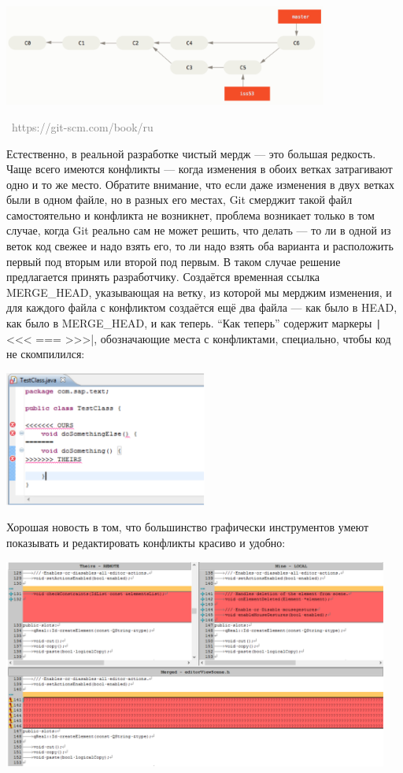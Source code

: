 \documentclass[a5paper]{article}
\newcommand{\attribution}[1] {
\vspace{-5mm}\begin{flushright}\begin{scriptsize}\textcolor{gray}{\textcopyright\, #1}\end{scriptsize}\end{flushright}
}
\begin{document}
\begin{center}
	\includegraphics[width=0.8\textwidth]{mergeResult.png}
	\attribution{https://git-scm.com/book/ru}
\end{center}

Естественно, в реальной разработке чистый мердж --- это большая редкость. Чаще всего имеются конфликты --- когда изменения в обоих ветках затрагивают одно и то же место. Обратите внимание, что если даже изменения в двух ветках были в одном файле, но в разных его местах, Git смерджит такой файл самостоятельно и конфликта не возникнет, проблема возникает только в том случае, когда Git реально сам не может решить, что делать --- то ли в одной из веток код свежее и надо взять его, то ли надо взять оба варианта и расположить первый под вторым или второй под первым. В таком случае решение предлагается принять разработчику. Создаётся временная ссылка MERGE\_HEAD, указывающая на ветку, из которой мы мерджим изменения, и для каждого файла с конфликтом создаётся ещё два файла --- как было в HEAD, как было в MERGE\_HEAD, и как теперь. ``Как теперь'' содержит маркеры \texttt|<<< === >>>|, обозначающие места с конфликтами, специально, чтобы код не скомпилился:

\begin{center}
	\includegraphics[width=0.5\textwidth]{conflictsInCode.png}
\end{center}

Хорошая новость в том, что большинство графически инструментов умеют показывать и редактировать конфликты красиво и удобно:

\begin{center}
	\includegraphics[width=0.95\textwidth]{conflicts.png}
\end{center}
\end{document}
